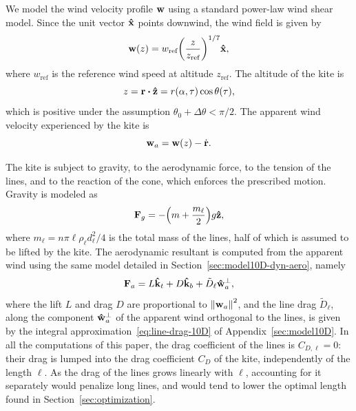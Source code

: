 We model the wind velocity profile \( \vb w \) using a standard power-law wind shear model. %
Since the unit vector \( \vu x \) points downwind, the wind field is given by
\begin{equation}
    \vb w(z) = w_{\text{ref}} \qty(\frac{z}{z_{\text{ref}}})^{1/7} \vu x,
\end{equation}
where \( w_{\text{ref}} \) is the reference wind speed at altitude \( z_{\text{ref}} \).
The altitude of the kite is
\begin{equation}
    z = \vb r \vdot \vu z = r(\alpha, \tau) \cos\theta(\tau),
\end{equation}
which is positive under the assumption \(\theta_0+\Delta\theta<\pi/2\).
The apparent wind velocity experienced by the kite is
\begin{equation}
    \vb w_a = \vb w(z) - \dot{\vb r}.
\end{equation}

The kite is subject to gravity, to the aerodynamic force, to the tension of the lines, and to the reaction of the cone, which enforces the prescribed motion. Gravity is modeled as
\begin{equation} \label{eq:f_grav}
    \vb F_g = -\qty(m + \frac{m_\ell}{2}) g \vu z,
\end{equation}
where \(m_\ell = n \pi \ell \rho_\ell d_\ell^2 / 4\) is the total mass of the lines, half of which is assumed to be lifted by the kite.
The aerodynamic resultant is computed from the apparent wind using the same model detailed in Section~\ref{sec:model10D-dyn-aero}, namely
\begin{equation} \label{eq:f_aero}
    \vb F_a = L \vu k_t + D \vu k_b + \tilde D_\ell \vu w_a^\perp,
\end{equation}
where the lift \(L\) and drag \(D\) are proportional to \(\norm{\vb w_a}^2\), and the line drag \(\tilde D_\ell\), along the component \(\vu w_a^\perp\) of the apparent wind orthogonal to the lines, is given by the integral approximation~\eqref{eq:line-drag-10D} of Appendix~\ref{sec:model10D}.
In all the computations of this paper, the drag coefficient of the lines is \(C_{D,\ell} = 0\): their drag is lumped into the drag coefficient \(C_D\) of the kite, independently of the length \(\ell\).
As the drag of the lines grows linearly with \(\ell\), accounting for it separately would penalize long lines, and would tend to lower the optimal length found in Section~\ref{sec:optimization}.

